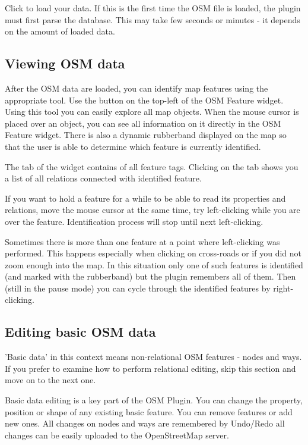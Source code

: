 Click  to load your data. If this is the first time the OSM
file is loaded, the plugin must first parse the database. This may take few
seconds or minutes - it depends on the amount of loaded data.

\subsection{Viewing OSM data}

After the OSM data are loaded, you can identify map features using the
appropriate tool. Use the 
button on the top-left of the OSM Feature widget. Using this tool you can
easily explore all map objects. When the mouse cursor is placed over an
object, you can see all information on it directly in the OSM Feature widget.
There is also a dynamic rubberband displayed on the map so that the user
is able to determine which feature is currently identified.

The  tab of the widget contains of all feature tags.
Clicking on the  tab shows you a list of all relations
connected with identified feature.

If you want to hold a feature for a while to be able to read its properties
and relations, move the mouse cursor at the same time, try left-clicking
while you are over the feature. Identification process will stop until next
left-clicking.

Sometimes there is more than one feature at a point where left-clicking
was performed. This happens especially when clicking on cross-roads or if
you did not zoom enough into the map. In this situation only one of such
features is identified (and marked with the rubberband) but the plugin
remembers all of them. Then (still in the pause mode) you can cycle through the
identified features by right-clicking.

\subsection{Editing basic OSM data}

'Basic data'  in this context means non-relational OSM features -
nodes and ways. If you prefer to examine how to perform relational editing, 
skip this section and move on to the next one.

Basic data editing is a key part of the OSM Plugin. You can change the property,
position or shape of any existing basic feature. You can remove features or
add new ones. All changes on nodes and ways are remembered by Undo/Redo all 
changes can be easily uploaded to the OpenStreetMap server.

